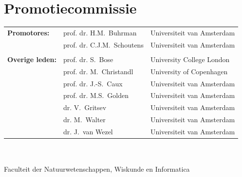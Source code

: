 \section*{Promotiecommissie}
\setlength\tabcolsep{6mm}
\begin{tabular}[t]{@{}lll}
\textbf{Promotores:}    &  prof. dr. H.M.~Buhrman 	 & Universiteit van Amsterdam \\  
						&  prof. dr. C.J.M.~Schoutens   & Universiteit van Amsterdam \\  
\\
\textbf{Overige leden:} 
			   & prof. dr. S.~Bose     		&  University College London \\  
               & prof. dr. M.~Christandl 	& University of Copenhagen \\ 
               & prof. dr. J.-S.~Caux 		& Universiteit van Amsterdam \\  
               & prof. dr. M.S.~Golden 		& Universiteit van Amsterdam \\  
               & dr. V.~Gritsev 			& Universiteit van Amsterdam \\  
               & dr. M.~Walter				& Universiteit van Amsterdam \\                                                           
               & dr. J.~van Wezel 			& Universiteit van Amsterdam 
\end{tabular}\\
\\
Faculteit der Natuurwetenschappen, Wiskunde en Informatica\\
